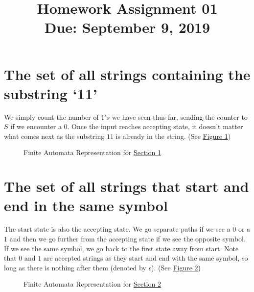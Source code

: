 \documentclass[11pt,letterpaper]{article}
\title{Homework Assignment 01 \\
    \small Due: September 9, 2019}
\begin{document}
\maketitle

\section{The set of all strings containing the substring `11'}
\label{sec:s1}
We simply count the number of $1's$ we have seen thus far, sending the counter to $S$ if we encounter a $0$. Once the input reaches accepting state, it doesn't matter what comes next as the substring $11$ is already in the string. (See \hyperref[fig:fsm1]{Figure 1})
\begin{figure}[ht]
\centering
{}
\caption{Finite Automata Representation for \hyperref[sec:s1]{Section 1}}
\label{fig:fsm1}
\end{figure}

\section{The set of all strings that start and end in the same symbol}
\label{sec:s2}
The start state is also the accepting state. We go separate paths if we see a $0$ or a $1$ and then we go further from the accepting state if we see the opposite symbol. If we see the same symbol, we go back to the first state away from start. Note that $0$ and $1$ are accepted strings as they start and end with the same symbol, so long as there is nothing after them (denoted by $\epsilon$). (See \hyperref[fig:fsm2]{Figure 2})
\begin{figure}[ht]
\centering
{}
\caption{Finite Automata Representation for \hyperref[sec:s2]{Section 2}}
\label{fig:fsm2}
\end{figure}
\end{document}
